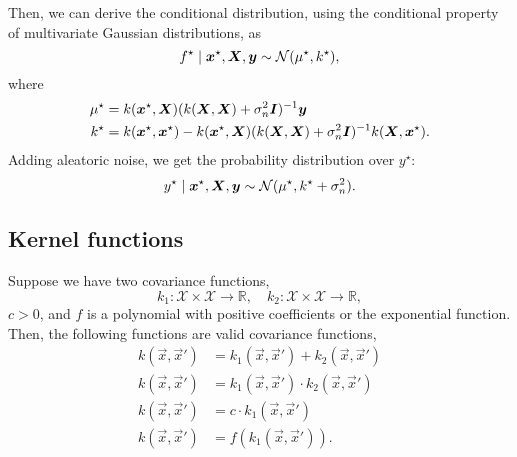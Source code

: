 Then, we can derive the conditional distribution, using the conditional
property of multivariate Gaussian distributions, as \[
  f^\star \mid \bm{x}^\star, \bm{X}, \bm{y} \sim \mathcal{N}(\mu^\star,k^\star)
,\]
where
\begin{align*}
  \mu^\star &= k(\bm{x}^\star, \bm{X}) (k(\bm{X}, \bm{X})+\sigma_n^2\bm{I})^{-1} \bm{y} \\
  k^\star &= k(\bm{x}^\star,\bm{x}^\star) - k(\bm{x}^\star,\bm{X}) (k(\bm{X},\bm{X})+\sigma_n^2\bm{I})^{-1} k(\bm{X},\bm{x}^\star)
.\end{align*}
Adding aleatoric noise, we get the probability distribution over $y^\star$: \[
  y^\star\mid\bm{x}^\star,\bm{X},\bm{y}\sim\mathcal{N}(\mu^\star,k^\star+\sigma_n^2)
.\]


\subsection{Kernel functions}

Suppose we have two covariance functions, \[
  k_1 : \mathcal{X} \times \mathcal{X} \to \mathbb{R}, \hspace{1em} k_2 :
  \mathcal{X} \times \mathcal{X} \to \mathbb{R}
,\]
$c>0$, and $f$ is a polynomial with positive coefficients or the exponential
function. Then, the following functions are valid covariance functions,
\begin{align*}
  k(\vec{x},\vec{x}') &= k_1(\vec{x},\vec{x}')+k_2(\vec{x},\vec{x}') \\
  k(\vec{x},\vec{x}') &= k_1(\vec{x},\vec{x}')\cdot k_2(\vec{x},\vec{x}') \\
  k(\vec{x},\vec{x}') &= c\cdot k_1(\vec{x},\vec{x}') \\
  k(\vec{x},\vec{x}') &= f(k_1(\vec{x},\vec{x}'))
.\end{align*}

